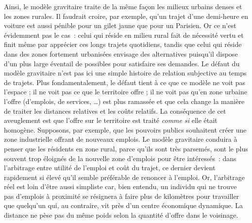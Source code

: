 \documentclass[
  10pt,
  a4paper,
  numbers=noendperiod,
  DIV=9]{scrartcl}
\begin{document}
Ainsi, le modèle gravitaire traite de la même façon les milieux urbains
denses et les zones rurales. Il faudrait croire, par exemple, qu'un
trajet d'une demi-heure en voiture est aussi pénible pour un gilet jaune
que pour un Parisien. Or ce n'est évidemment pas le cas~: celui qui
réside en milieu rural fait de nécessité vertu et finit même par
apprécier ces longs trajets quotidiens, tandis que celui qui réside dans
des zones fortement urbanisées envisage des alternatives puisqu'il
dispose d'un plus large éventail de possibles pour satisfaire ses
demandes. Le défaut du modèle gravitaire n'est pas ici une simple
histoire de relation subjective au temps de trajets. Plus
fondamentalement, le défaut tient à ce que ce modèle ne voit pas
l'espace ; il ne voit pas ce que le territoire offre ; il ne voit pas
qu'en zone urbaine l'offre (d'emplois, de services, \ldots) est plus
ramassée et que cela change la manière de traiter les distances
relatives et les coûts relatifs. La conséquence de cet aveuglement est
que l'offre sur le territoire est traité \emph{comme si} elle était
homogène. Supposons, par exemple, que les pouvoirs publics souhaitent
créer une zone industrielle offrant de nouveaux emplois. Le modèle
gravitaire conduira à penser que les résidents en zone rural, parce
qu'ils sont très parsemés, sont le plus souvent trop éloignés de la
nouvelle zone d'emplois pour être intéressés~: dans l'arbitrage entre
utilité de l'emploi et coût du trajet, ce dernier devient rapidement si
élevé qu'il semble préférable de renoncer à l'emploi. Or, l'arbitrage
réel est loin d'être aussi simpliste car, bien entendu, un individu qui
ne trouve pas d'emplois à proximité se résignera à faire plus de
kilomètres pour travailler que quelqu'un qui, au contraire, vit près
d'un centre économique dynamique. La distance ne pèse pas du même poids
selon la quantité d'offre dans le voisinage.
\end{document}
